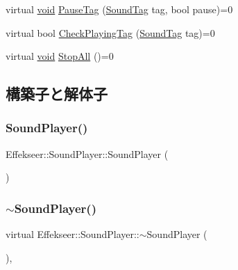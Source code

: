 \begin{DoxyCompactItemize}
\item 
virtual \mbox{\hyperlink{namespace_effekseer_ab34c4088e512200cf4c2716f168deb56}{void}} \mbox{\hyperlink{class_effekseer_1_1_sound_player_a331ad801eed06611fffc50354837b70e}{Pause\+Tag}} (\mbox{\hyperlink{namespace_effekseer_adb219197297396cf2ab9bee657551a29}{Sound\+Tag}} tag, bool pause)=0
\item 
virtual bool \mbox{\hyperlink{class_effekseer_1_1_sound_player_a12a4c022f15f7a8a9d3e3235a351606c}{Check\+Playing\+Tag}} (\mbox{\hyperlink{namespace_effekseer_adb219197297396cf2ab9bee657551a29}{Sound\+Tag}} tag)=0
\item 
virtual \mbox{\hyperlink{namespace_effekseer_ab34c4088e512200cf4c2716f168deb56}{void}} \mbox{\hyperlink{class_effekseer_1_1_sound_player_a058465ab0f8c94607651a743767f64d2}{Stop\+All}} ()=0
\end{DoxyCompactItemize}


\subsection{構築子と解体子}
\mbox{\label{class_effekseer_1_1_sound_player_a64593615152ced591b2b347fc7555d69}} 
\subsubsection{\texorpdfstring{Sound\+Player()}{SoundPlayer()}}
{\footnotesize\ttfamily Effekseer\+::\+Sound\+Player\+::\+Sound\+Player (\begin{DoxyParamCaption}{ }\end{DoxyParamCaption})\hspace{0.3cm}{\ttfamily [inline]}}

\mbox{\label{class_effekseer_1_1_sound_player_a93693b494f59c66a1a5e6a830fa4b62f}} 
\subsubsection{\texorpdfstring{$\sim$\+Sound\+Player()}{~SoundPlayer()}}
{\footnotesize\ttfamily virtual Effekseer\+::\+Sound\+Player\+::$\sim$\+Sound\+Player (\begin{DoxyParamCaption}{ }\end{DoxyParamCaption})\hspace{0.3cm}{\ttfamily [inline]}, {\ttfamily [virtual]}}



